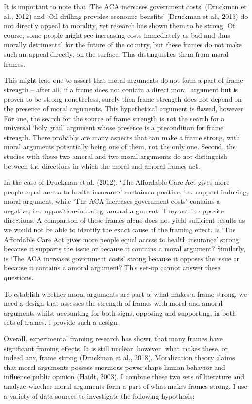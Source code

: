 \documentclass[12pt,econ]{sources/authesis}
\begin{document}
It is important to note that `The ACA increases government costs' (Druckman et al., 2012) and `Oil drilling provides economic benefits' (Druckman et al., 2013) do not directly appeal to morality, yet research has shown them to be strong. Of course, some people might see increasing costs immediately as bad and thus morally detrimental for the future of the country, but these frames do not make such an appeal directly, on the surface. This distinguishes them from moral frames.

This might lead one to assert that moral arguments do not form a part of frame strength -- after all, if a frame does not contain a direct moral argument but is proven to be strong nonetheless, surely then frame strength does not depend on the presence of moral arguments. This hypothetical argument is flawed, however. For one, the search for the source of frame strength is not the search for a universal `holy grail' argument whose presence is a precondition for frame strength. There probably are many aspects that can make a frame strong, with moral arguments potentially being one of them, not the only one. Second, the studies with these two amoral and two moral arguments do not distinguish between the directions in which the moral and amoral frames act.

In the case of Druckman et al. (2012), `The Affordable Care Act gives more people equal access to health insurance' contains a positive, i.e.~support-inducing, moral argument, while `The ACA increases government costs' contains a negative, i.e.~opposition-inducing, amoral argument. They act in opposite directions. A comparison of these frames alone does not yield sufficient results as we would not be able to identify the exact cause of the framing effect. Is `The Affordable Care Act gives more people equal access to health insurance' strong because it supports the issue or because it contains a moral argument? Similarly, is `The ACA increases government costs' strong because it opposes the issue or because it contains a amoral argument? This set-up cannot answer these questions.

To establish whether moral arguments are part of what makes a frame strong, we need a design that assesses the strength of frames with moral and amoral arguments whilst accounting for both signs, opposing and supporting, in both sets of frames. I provide such a design.

Overall, experimental framing research has shown that many frames have significant framing effects. It is still unclear, however, what makes these, or indeed any, frame strong (Druckman et al., 2018). Moralization theory claims that moral arguments possess enormous power shape human behavior and influence public opinion (Haidt, 2003). I combine these two sets of literature and analyze whether moral arguments form a part of what makes frames strong. I use a variety of data sources to investigate the following hypothesis:
\end{document}
